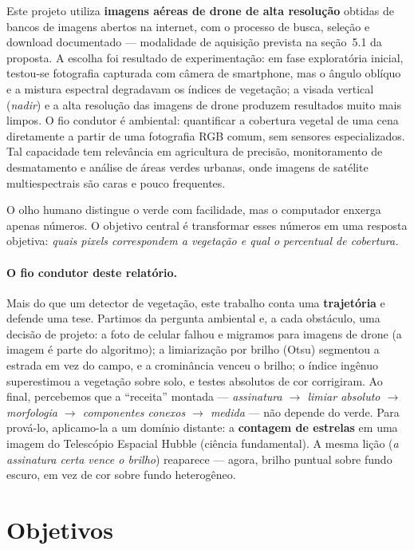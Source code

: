 \documentclass[12pt,a4paper]{article}
\begin{document}
Este projeto utiliza \textbf{imagens aéreas de drone de alta resolução} obtidas de bancos de
imagens abertos na internet, com o processo de busca, seleção e download documentado ---
modalidade de aquisição prevista na seção~5.1 da proposta. A escolha foi resultado de
experimentação: em fase exploratória inicial, testou-se fotografia capturada com câmera de
smartphone, mas o ângulo oblíquo e a mistura espectral degradavam os índices de vegetação;
a visada vertical (\emph{nadir}) e a alta resolução das imagens de drone produzem resultados
muito mais limpos. O fio condutor é ambiental: quantificar a cobertura vegetal de uma cena
diretamente a partir de uma fotografia RGB comum, sem sensores especializados. Tal capacidade
tem relevância em agricultura de precisão, monitoramento de desmatamento e análise de áreas
verdes urbanas, onde imagens de satélite multiespectrais são caras e pouco frequentes.

O olho humano distingue o verde com facilidade, mas o computador enxerga apenas números. O
objetivo central é transformar esses números em uma resposta objetiva: \emph{quais pixels
correspondem a vegetação e qual o percentual de cobertura.}

\paragraph{O fio condutor deste relatório.} Mais do que um detector de vegetação, este trabalho
conta uma \textbf{trajetória} e defende uma tese. Partimos da pergunta ambiental e, a cada
obstáculo, uma decisão de projeto: a foto de celular falhou e migramos para imagens de drone (a
imagem é parte do algoritmo); a limiarização por brilho (Otsu) segmentou a estrada em vez do
campo, e a crominância venceu o brilho; o índice ingênuo superestimou a vegetação sobre solo, e
testes absolutos de cor corrigiram. Ao final, percebemos que a ``receita'' montada ---
\emph{assinatura $\rightarrow$ limiar absoluto $\rightarrow$ morfologia $\rightarrow$ componentes
conexos $\rightarrow$ medida} --- não depende do verde. Para prová-lo, aplicamo-la a um
domínio distante: a \textbf{contagem de estrelas} em uma imagem do Telescópio Espacial Hubble
(ciência fundamental). A mesma lição (\emph{a assinatura certa vence o brilho}) reaparece ---
agora, brilho puntual sobre fundo escuro, em vez de cor sobre fundo heterogêneo.

\section{Objetivos}
\end{document}
